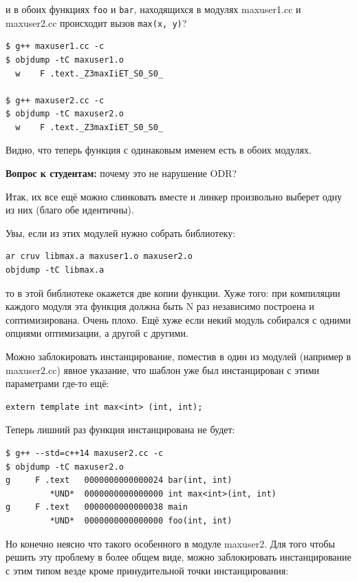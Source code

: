 \documentclass[a4paper,12pt,oneside]{article}
\newif\ifanswers
\begin{document}
и в обоих функциях \lstinline!foo! и \lstinline!bar!, находящихся в модулях maxuser1.cc и maxuser2.cc происходит вызов \lstinline!max(x, y)!?

\begin{verbatim}
$ g++ maxuser1.cc -c
$ objdump -tC maxuser1.o
  w    F .text._Z3maxIiET_S0_S0_

$ g++ maxuser2.cc -c
$ objdump -tC maxuser2.o
  w    F .text._Z3maxIiET_S0_S0_
\end{verbatim}

Видно, что теперь функция с одинаковым именем есть в обоих модулях.

\textbf{Вопрос к студентам:} почему это не нарушение ODR?

\ifanswers
Верный ответ: в ODR для шаблонных функций слово one означает один на модуль
\fi

Итак, их все ещё можно слинковать вместе и линкер произвольно выберет одну из них (благо обе идентичны).

Увы, если из этих модулей нужно собрать библиотеку:

\begin{verbatim}
ar cruv libmax.a maxuser1.o maxuser2.o
objdump -tC libmax.a
\end{verbatim}

то в этой библиотеке окажется две копии функции. Хуже того: при компиляции каждого модуля эта функция должна быть N раз независимо построена и соптимизирована. Очень плохо. Ещё хуже если некий модуль собирался с одними опциями оптимизации, а другой с другими.

Можно заблокировать инстанцирование, поместив в один из модулей (например в maxuser2.cc) явное указание, что шаблон уже был инстанцирован с этими параметрами где-то ещё:

\begin{lstlisting}
extern template int max<int> (int, int);
\end{lstlisting}

Теперь лишний раз функция инстанцирована не будет:

\begin{verbatim}
$ g++ --std=c++14 maxuser2.cc -c
$ objdump -tC maxuser2.o
g     F .text	0000000000000024 bar(int, int)
         *UND*	0000000000000000 int max<int>(int, int)
g     F .text	0000000000000038 main
         *UND*	0000000000000000 foo(int, int)
\end{verbatim}

Но конечно неясно что такого особенного в модуле maxuser2. Для того чтобы решить эту проблему в более общем виде, можно заблокировать инстанцирование с этим типом везде кроме принудительной точки инстанцирования:
\end{document}
